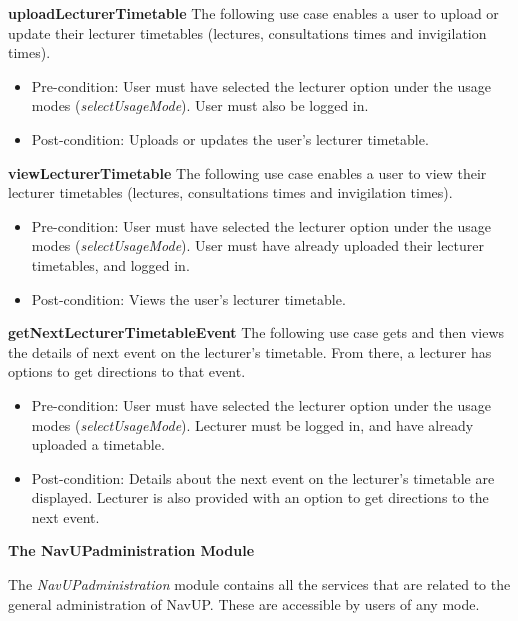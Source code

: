 \documentclass[12pt,a4paper]{article}
\begin{document}
		\textbf{uploadLecturerTimetable}
		The following use case enables a user to upload or update their lecturer timetables (lectures, consultations times and 		invigilation times).
			
		\begin{itemize}
		  \item Pre-condition: User must have selected the lecturer option under the usage modes (\textit{selectUsageMode}). 					User must also be logged in.
		   \item Post-condition: Uploads or updates the user's lecturer timetable.
		\end{itemize}
		
	    \textbf{viewLecturerTimetable}
		The following use case enables a user to view their lecturer timetables (lectures, consultations times and 		     		    invigilation times).
			
		\begin{itemize}
		  \item Pre-condition: User must have selected the lecturer option under the usage modes (\textit{selectUsageMode}). 			        User must have already uploaded their lecturer timetables, and logged in.
		   \item Post-condition: Views the user's lecturer timetable.
		\end{itemize}
		
	    \textbf{getNextLecturerTimetableEvent}
		The following use case gets and then views the details of next event on the lecturer's timetable. From there, a 			    lecturer has options to get directions to that event.
			
		\begin{itemize}
		  \item Pre-condition: User must have selected the lecturer option under the usage modes (\textit{selectUsageMode}). 		            Lecturer must be logged in, and have already uploaded a timetable.
		   \item Post-condition: Details about the next event on the lecturer's timetable are displayed. Lecturer is also 						 provided with an option to get directions to the next event.
		\end{itemize}
		
		\textbf{The NavUPadministration Module} \newline
	    
		The \textit{NavUPadministration} module contains all the services that are related to the general administration of 			NavUP. These are accessible by users of any mode.
	    
\end{document}
